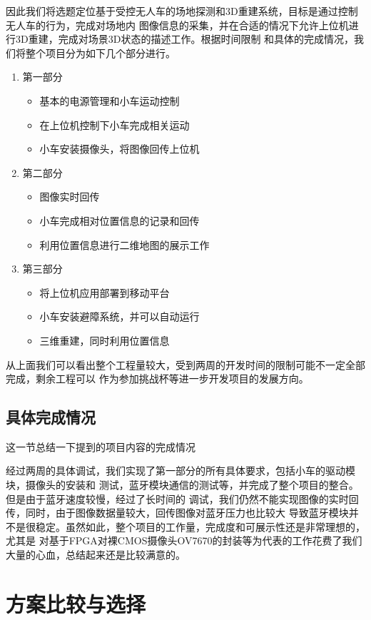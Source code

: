 \documentclass[a4paper]{paper}
\begin{document}
因此我们将选题定位基于受控无人车的场地探测和3D重建系统，目标是通过控制无人车的行为，完成对场地内
图像信息的采集，并在合适的情况下允许上位机进行3D重建，完成对场景3D状态的描述工作。根据时间限制
和具体的完成情况，我们将整个项目分为如下几个部分进行。
\begin{enumerate}
    \item 第一部分
    \begin{itemize}
        \item 基本的电源管理和小车运动控制
        \item 在上位机控制下小车完成相关运动
        \item 小车安装摄像头，将图像回传上位机
    \end{itemize}
    \item 第二部分
    \begin{itemize}
        \item 图像实时回传
        \item 小车完成相对位置信息的记录和回传
        \item 利用位置信息进行二维地图的展示工作
    \end{itemize}
    \item 第三部分
    \begin{itemize}
        \item 将上位机应用部署到移动平台
        \item 小车安装避障系统，并可以自动运行
        \item 三维重建，同时利用位置信息
    \end{itemize}
\end{enumerate}
从上面我们可以看出整个工程量较大，受到两周的开发时间的限制可能不一定全部完成，剩余工程可以
作为参加挑战杯等进一步开发项目的发展方向。
\subsection{具体完成情况}
这一节总结一下提到的项目内容的完成情况

经过两周的具体调试，我们实现了第一部分的所有具体要求，包括小车的驱动模块，摄像头的安装和
测试，蓝牙模块通信的测试等，并完成了整个项目的整合。但是由于蓝牙速度较慢，经过了长时间的
调试，我们仍然不能实现图像的实时回传，同时，由于图像数据量较大，回传图像对蓝牙压力也比较大
导致蓝牙模块并不是很稳定。虽然如此，整个项目的工作量，完成度和可展示性还是非常理想的，尤其是
对基于FPGA对裸CMOS摄像头OV7670的封装等为代表的工作花费了我们大量的心血，总结起来还是比较满意的。
\section{方案比较与选择}
\end{document}
